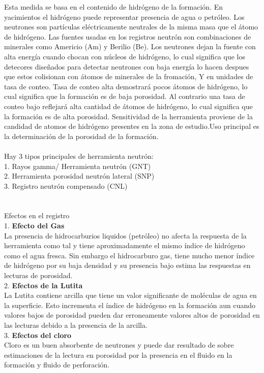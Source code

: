 \documentclass[10pt,a4paper]{report}
\begin{document}
\newpage
Esta medida se basa en el contenido de hidrógeno de la formación. En yacimientos el hidrógeno puede representar presencia de agua o petróleo. Los neutrones son partículas eléctricamente neutrales de la misma masa que el átomo de hidrógeno. Las fuentes usadas en los registros neutrón son combinaciones de minerales como Americio (Am) y Berilio (Be). Los neutrones dejan la fuente con alta energía cuando chocan con núcleos de hidrógeno, lo cual significa que los detecores diseñados para detectar neutrones con baja energía lo hacen despues que estos colisionan con átomos de minerales de la fromación, Y en unidades de tasa de conteo. Tasa de conteo alta demostrará pocos átomos de hidrógeno, lo cual significa que la formación es de baja porosidad. Al contrario una tasa de conteo bajo reflejará alta cantidad de átomos de hidrógeno, lo cual significa que la formación es de alta porosidad. Sensitividad de la herramienta proviene de la candidad de atomos de hidrógeno presentes en la zona de estudio.Uso principal es la determinación de la porosidad de la formación.
\\\\ Hay 3 tipos principales de herramienta neutrón:
\\ 1. Rayos gamma/ Herramienta neutrón (GNT)
\\ 2. Herramienta porosidad neutrón lateral (SNP)
\\ 3. Registro neutrón compensado (CNL)
\\
\\\\ Efectos en el registro
\\ 1. \textbf{Efecto del Gas} 
\\ La presencia de hidrocarburios liquidos (petróleo) no afecta la respuesta de la herramienta como tal y tiene aproximadamente el mismo índice de hidrógeno como el agua fresca. Sin embargo el hidrocarburo gas, tiene mucho menor índice de hidrógeno por su baja densidad y su presencia bajo estima las respuestas en lecturas de porosidad.
\\ 2. \textbf{Efectos de la Lutita}
\\ La Lutita contiene arcilla que tiene un valor significante de moléculas de agua en la superficie. Esto incrementa el índice de hidrógeno en la formación aun cuando valores bajos de porosidad pueden dar erroneamente valores altos de porosidad en las lecturas debido a la presencia de la arcilla.
\\ 3. \textbf {Efectos del cloro}
\\ Cloro es un buen absorbente de neutrones y puede dar resultado de sobre estimaciones de la lectura en porosidad por la presencia en el fluido en la formación y fluido de perforación.
\end{document}
